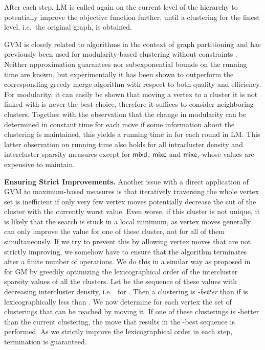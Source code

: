 \documentclass{llncs}
\newcommand{\measure}[1]{\ensuremath{\text{\normalfont{\sffamily {#1}}}}\xspace}
\newcommand{\andreapar}{\vspace*{.5ex}\par\noindent}
\begin{document}
After each step, LM is called again on the current level of the hierarchy to potentially improve the objective function further, until a clustering for the finest level, i.e.~the original graph, is obtained.  
\par
GVM is closely related to algorithms in the context of graph partitioning and has previously been used for modularity-based clustering without constraints \cite{bgll-f-08,rn-m-11}. 
Neither approximation guarantees nor subexponential bounds on the running time are known, but experimentally it has been shown to outperform the corresponding greedy merge algorithm with respect to both quality and efficiency.
For modularity, it can easily be shown that moving a vertex to a cluster it is not linked with is never the best choice, therefore it suffices to consider neighboring clusters.
Together with the observation that the change in modularity can be determined in constant time for each move if some information about the clustering is maintained, this yields a running time in  for each round in LM.
This latter observation on running time also holds for all intracluster density and intercluster sparsity measures except for \measure{mixd}, \measure{mixc} and \measure{mixe}, whose values are expensive to maintain.
\andreapar\textbf{Ensuring Strict Improvements.}
Another issue with a direct application of GVM to maximum-based measures is that iteratively traversing the whole vertex set is inefficient if only very few vertex moves potentially decrease the cut of the cluster with the currently worst value.
Even worse, if this cluster is not unique, it is likely that the search is stuck in a local minimum, as vertex moves generally can only improve the value for one of these cluster, not for all of them simultaneously.
If we try to prevent this by allowing vertex moves that are not strictly improving, we somehow have to ensure that the algorithm terminates after a finite number of operations.
We do this in a similar way as proposed in~\cite{gsw-dcgc-11b} for GM by greedily optimizing the lexicographical order of the intercluster sparsity values of all the clusters.
Let  be the sequence of these values with decreasing intercluster density, i.e.~ for .
Then a clustering  is \emph{-better} than  if  is lexicographically less than .
We now determine for each vertex the set of clusterings that can be reached by moving it. 
If one of these clusterings is -better than the current clustering,
the move that results in the -best sequence is performed.
As we strictly improve the lexicographical order in each step, termination is guaranteed.
\end{document}
